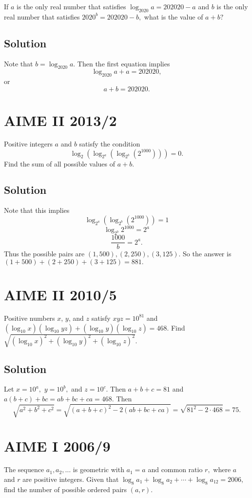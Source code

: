 \documentclass[blue,onecol]{shooting}
\begin{document}
If $a$ is the only real number that satisfies $\log_{2020}a=202020-a$ and $b$ is the only real number that satisfies $2020^b=202020-b,$ what is the value of $a+b?$

\subsection{Solution}

Note that $b=\log_{2020}a.$ Then the first equation implies
    \[\log_{2020}a+a=202020,\] or
    \[a+b=202020.\]

\section{AIME II 2013/2}

Positive integers $a$ and $b$ satisfy the condition \[\log_2(\log_{2^a}(\log_{2^b}(2^{1000}))) = 0.\] Find the sum of all possible values of $a+b$.

\subsection{Solution}

Note that this implies
\[\log_{2^a}(\log_{2^b}(2^{1000}))=1\]
\[\log_{2^b}2^{1000}=2^a\]
\[\frac{1000}{b}=2^a.\]
Thus the possible pairs are $(1,500),(2,250),(3,125).$ So the answer is $(1+500)+(2+250)+(3+125)=881.$

\section{AIME II 2010/5}

Positive numbers $x$, $y$, and $z$ satisfy $xyz = 10^{81}$ and $(\log_{10}x)(\log_{10} yz) + (\log_{10}y) (\log_{10}z) = 468$. Find $\sqrt {(\log_{10}x)^2 + (\log_{10}y)^2 + (\log_{10}z)^2}$.

\subsection{Solution}

Let $x=10^a,$ $y=10^b,$ and $z=10^c.$ Then $a+b+c=81$ and $a(b+c)+bc=ab+bc+ca=468.$ Then
\[\sqrt{a^2+b^2+c^2}=\sqrt{(a+b+c)^2-2(ab+bc+ca)}=\sqrt{81^2-2\cdot 468}=75.\]

\section{AIME I 2006/9}

The sequence $a_1, a_2, \ldots$ is geometric with $a_1=a$ and common ratio $r,$ where $a$ and $r$ are positive integers. Given that $\log_8 a_1+\log_8 a_2+\cdots+\log_8 a_{12} = 2006,$ find the number of possible ordered pairs $(a,r).$
\end{document}
